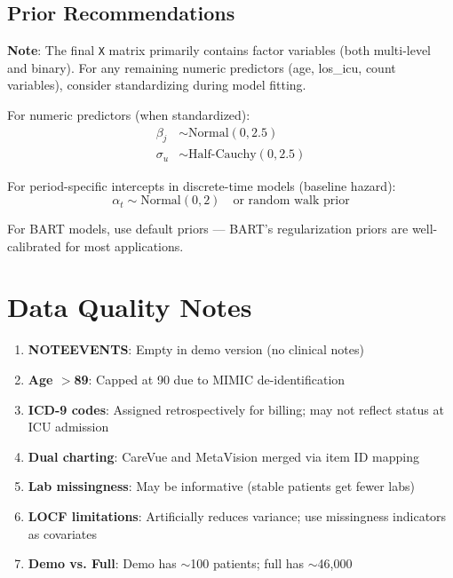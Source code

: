 \documentclass[11pt]{article}
\begin{document}
\subsection{Prior Recommendations}

\textbf{Note}: The final \texttt{X} matrix primarily contains factor variables (both multi-level and binary). For any remaining numeric predictors (age, los\_icu, count variables), consider standardizing during model fitting.

For numeric predictors (when standardized):
\begin{align*}
\beta_j &\sim \text{Normal}(0, 2.5) \\
\sigma_u &\sim \text{Half-Cauchy}(0, 2.5)
\end{align*}

For period-specific intercepts in discrete-time models (baseline hazard):
\[
\alpha_t \sim \text{Normal}(0, 2) \quad \text{or random walk prior}
\]

For BART models, use default priors --- BART's regularization priors are well-calibrated for most applications.

\section{Data Quality Notes}

\begin{enumerate}[leftmargin=*, nosep]
    \item \textbf{NOTEEVENTS}: Empty in demo version (no clinical notes)
    \item \textbf{Age $>$89}: Capped at 90 due to MIMIC de-identification
    \item \textbf{ICD-9 codes}: Assigned retrospectively for billing; may not reflect status at ICU admission
    \item \textbf{Dual charting}: CareVue and MetaVision merged via item ID mapping
    \item \textbf{Lab missingness}: May be informative (stable patients get fewer labs)
    \item \textbf{LOCF limitations}: Artificially reduces variance; use missingness indicators as covariates
    \item \textbf{Demo vs. Full}: Demo has $\sim$100 patients; full has $\sim$46,000
\end{enumerate}
\end{document}
